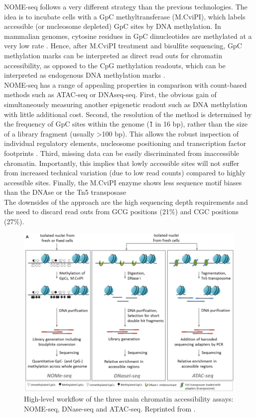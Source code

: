 NOME-seq follows a very different strategy than the previous technologies. The idea is to incubate cells with a GpC methyltransferase (M.CviPI), which labels accessible (or nucleosome depleted) GpC sites by DNA methylation. In mammalian genomes, cytosine residues in GpC dinucleotides are methylated at a very low rate \cite{Kilgore2007}. Hence, after M.CviPI treatment and bisulfite sequencing, GpC methylation marks can be interpreted as direct read outs for chromatin accessibility, as opposed to the CpG methylation readouts, which can be interpreted as endogenous DNA methylation marks \cite{Kelly2012}.\\
NOME-seq has a range of appealing properties in comparison with count-based methods such as ATAC-seq or DNAseq-seq. First, the obvious gain of simultaneously measuring another epigenetic readout such as DNA methylation with little additional cost. Second, the resolution of the method is determined by the frequency of GpC sites within the genome (\~1 in 16 bp), rather than the size of a library fragment (usually >100 bp). This allows the robust inspection of individual regulatory elements, nucleosome positioning and transcription factor footprints \cite{Kelly2012,Pott2016,Nordstrom2019}. Third, missing data can be easily discriminated from inaccessible chromatin. Importantly, this implies that lowly accessible sites will not suffer from increased technical variation (due to low read counts) compared to highly accessible sites. Finally, the M.CviPI enzyme shows less sequence motif biases than the DNAse or the Tn5 transposase \cite{Nordstrom2019}\\ 
The downsides of the approach are the high sequencing depth requirements and the need to discard read outs from GCG positions (21\%) and CGC positions (27\%).

\begin{figure}[H]
	\centering
	\includegraphics[width=0.9\linewidth]{ChromatinAcc_protocols}
	\caption[]{High-level workflow of the three main chromatin accessibility assays: NOME-seq, DNase-seq and ATAC-seq. Reprinted from \cite{Nordstrom2019}. }
	\label{fig:ChromatinAcc_protocols}
\end{figure}

